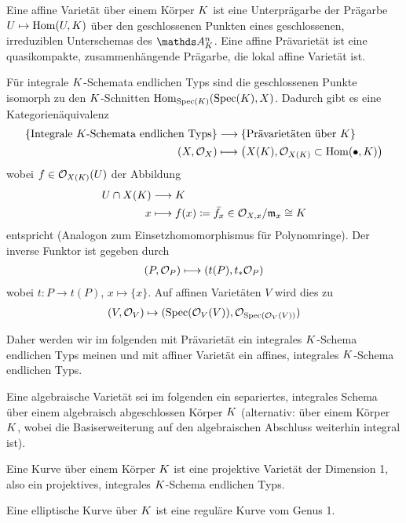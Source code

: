 \documentclass[german]{scrreprt}
\begin{document}
\begin{Definition}[Varietät]
Eine affine Varietät über einem Körper $K$ ist eine Unterprägarbe der Prägarbe 
$U\mapsto \operatorname{Hom}(U,K)$ über den geschlossenen Punkten eines
geschlossenen, irreduziblen Unterschemas des $\A_\K^n$.
Eine affine Prävarietät ist eine quasikompakte, zusammenhängende
Prägarbe, die lokal affine Varietät ist.

Für integrale $K$-Schemata endlichen Typs sind die geschlossenen
Punkte isomorph zu den $K$-Schnitten 
$\operatorname{Hom}_{\operatorname{Spec}(K)}(\operatorname{Spec}(K),X)$.
Dadurch gibt es eine Kategorienäquivalenz
\begin{align*}
  \left\{\text{Integrale $K$-Schemata endlichen Typs}\right\}
  &\longrightarrow
  \left\{\text{Prävarietäten über $K$}\right\}\\
  (X,\mathcal{O}_X) 
  &\longmapsto
    \left( X(K), \mathcal{O}_{X(K)}\subset \operatorname{Hom}(\bullet, K) \right)
\end{align*}
wobei $f\in\mathcal{O}_{X(K)}(U)$ der Abbildung 
\begin{align*}
  U\cap X(K) &\longrightarrow K\\
  x  &\longmapsto f(x)
  \coloneqq \bar{f_x}\in\mathcal{O}_{X,x}/\mathfrak{m}_x\cong K
\end{align*}
entspricht (Analogon zum Einsetzhomomorphismus für Polynomringe).
Der inverse Funktor ist gegeben durch
\begin{align*}
  (P,\mathcal{O}_P) \longmapsto (t(P), t_\ast\mathcal{O}_P) 
\end{align*}
wobei $t\colon P\to t(P)$, $x\mapsto \{x\}$. Auf affinen Varietäten
$V$ wird dies zu
\begin{gather*}
  (V, \mathcal{O}_V) \mapsto (\operatorname{Spec}(\mathcal{O}_V(V)), \mathcal{O}_{\operatorname{Spec}(\mathcal{O}_V(V))})
\end{gather*}
\cite[Theorem 3.37]{wedhorn}

Daher werden wir im folgenden mit Prävarietät ein integrales
$K$-Schema endlichen Typs meinen und mit affiner Varietät ein affines,
integrales $K$-Schema endlichen Typs.

Eine algebraische Varietät sei im folgenden ein separiertes, integrales
Schema über einem algebraisch abgeschlossen Körper $K$
(alternativ: über einem Körper $K$, wobei die Basiserweiterung auf
den algebraischen Abschluss weiterhin integral ist).
\end{Definition}

\begin{Definition}
  Eine Kurve über einem Körper $K$ ist eine projektive Varietät der
  Dimension 1,
  also ein projektives, integrales $K$-Schema endlichen Typs.

  Eine elliptische Kurve über $K$ ist eine reguläre Kurve vom Genus 1.
\end{Definition}
\end{document}
